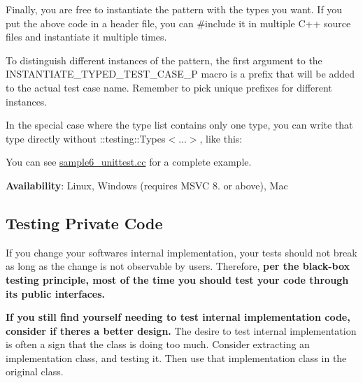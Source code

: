 \begin{DoxyCode}{0}
\end{DoxyCode}


Finally, you are free to instantiate the pattern with the types you want. If you put the above code in a header file, you can {\ttfamily \#include} it in multiple C++ source files and instantiate it multiple times.


\begin{DoxyCode}{0}
\end{DoxyCode}


To distinguish different instances of the pattern, the first argument to the {\ttfamily I\+N\+S\+T\+A\+N\+T\+I\+A\+T\+E\+\_\+\+T\+Y\+P\+E\+D\+\_\+\+T\+E\+S\+T\+\_\+\+C\+A\+S\+E\+\_\+P} macro is a prefix that will be added to the actual test case name. Remember to pick unique prefixes for different instances.

In the special case where the type list contains only one type, you can write that type directly without {\ttfamily \+::testing\+::\+Types$<$...$>$}, like this\+:


\begin{DoxyCode}{0}
\end{DoxyCode}


You can see {\ttfamily \mbox{\hyperlink{sample6__unittest_8cc}{sample6\+\_\+unittest.\+cc}}} for a complete example.

{\bfseries{Availability}}\+: Linux, Windows (requires M\+S\+VC 8. or above), Mac

\subsection*{Testing Private Code}

If you change your software\textquotesingle{}s internal implementation, your tests should not break as long as the change is not observable by users. Therefore, {\bfseries{per the black-\/box testing principle, most of the time you should test your code through its public interfaces.}}

{\bfseries{If you still find yourself needing to test internal implementation code, consider if there\textquotesingle{}s a better design.}} The desire to test internal implementation is often a sign that the class is doing too much. Consider extracting an implementation class, and testing it. Then use that implementation class in the original class.

